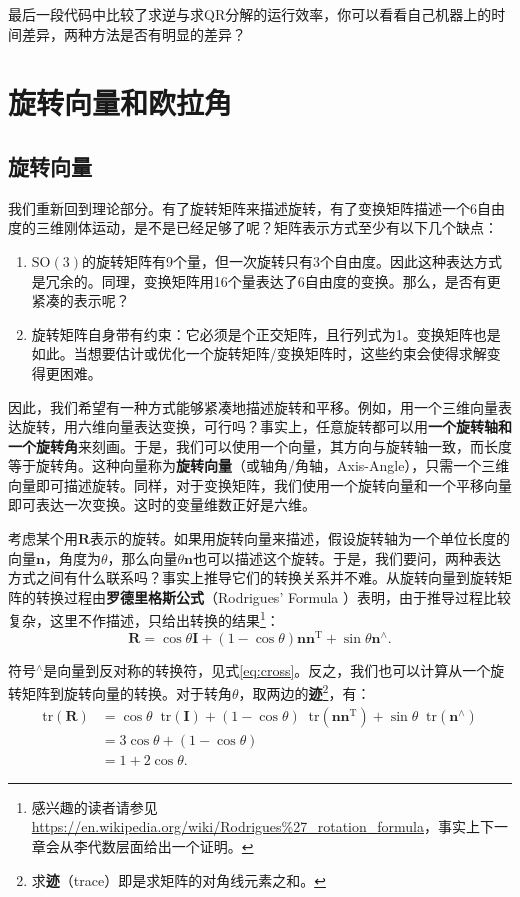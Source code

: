 最后一段代码中比较了求逆与求QR分解的运行效率，你可以看看自己机器上的时间差异，两种方法是否有明显的差异？

\section{旋转向量和欧拉角}
\subsection{旋转向量}
我们重新回到理论部分。有了旋转矩阵来描述旋转，有了变换矩阵描述一个6自由度的三维刚体运动，是不是已经足够了呢？矩阵表示方式至少有以下几个缺点：

\begin{enumerate}
	\item $\mathrm{SO}(3)$的旋转矩阵有9个量，但一次旋转只有3个自由度。因此这种表达方式是冗余的。同理，变换矩阵用16个量表达了6自由度的变换。那么，是否有更紧凑的表示呢？
	\item 旋转矩阵自身带有约束：它必须是个正交矩阵，且行列式为1。变换矩阵也是如此。当想要估计或优化一个旋转矩阵/变换矩阵时，这些约束会使得求解变得更困难。
\end{enumerate}

因此，我们希望有一种方式能够紧凑地描述旋转和平移。例如，用一个三维向量表达旋转，用六维向量表达变换，可行吗？事实上，任意旋转都可以用\textbf{一个旋转轴和一个旋转角}来刻画。于是，我们可以使用一个向量，其方向与旋转轴一致，而长度等于旋转角。这种向量称为\textbf{旋转向量}（或轴角/角轴，Axis-Angle），只需一个三维向量即可描述旋转。同样，对于变换矩阵，我们使用一个旋转向量和一个平移向量即可表达一次变换。这时的变量维数正好是六维。

考虑某个用$\bm{R}$表示的旋转。如果用旋转向量来描述，假设旋转轴为一个单位长度的向量$\bm{n}$，角度为$\theta$，那么向量$\theta \bm{n}$也可以描述这个旋转。于是，我们要问，两种表达方式之间有什么联系吗？事实上推导它们的转换关系并不难。从旋转向量到旋转矩阵的转换过程由\textbf{罗德里格斯公式}（Rodrigues' Formula ）表明，由于推导过程比较复杂，这里不作描述，只给出转换的结果\footnote{感兴趣的读者请参见\url{https://en.wikipedia.org/wiki/Rodrigues\%27_rotation_formula}，事实上下一章会从李代数层面给出一个证明。}：
\begin{equation}
\label{eq:rogridues}
\bm{R} = \cos \theta \bm{I} + \left( {1 - \cos \theta } \right) \bm{n}{\bm{n}^\mathrm{T}} + \sin \theta { \bm{n}^ \wedge }.
\end{equation}

符号$^\wedge$是向量到反对称的转换符，见式\eqref{eq:cross}。反之，我们也可以计算从一个旋转矩阵到旋转向量的转换。对于转角$\theta$，取两边的\textbf{迹}\footnote{求\textbf{迹}（trace）即是求矩阵的对角线元素之和。}，有：
\begin{equation}
\begin{aligned}
  \mathrm{tr} \left( \bm{R} \right) &= \cos \theta \mathop{}\!\mathrm{tr}\left( \bm{I} \right) + \left( {1 - \cos \theta } \right) \mathop{}\!\mathrm{tr} \left( { \bm{n} {\bm{n}^\mathrm{T}}} \right) + \sin \theta \mathop{}\!\mathrm{tr} ({\bm{n}^ \wedge })\\
&= 3\cos \theta  + (1 - \cos \theta )\\
&= 1 + 2\cos \theta .
\end{aligned} 
\end{equation}

